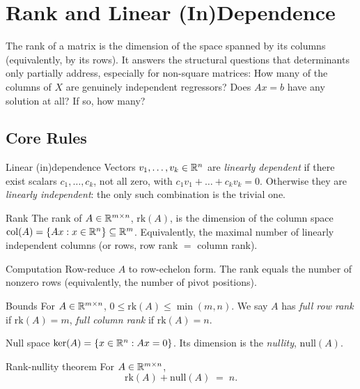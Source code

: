 \chapter{Rank and Linear (In)Dependence}

The rank of a matrix is the dimension of the space spanned by its columns
(equivalently, by its rows). It answers the structural questions that
determinants only partially address, especially for non-square matrices: How
many of the columns of $X$ are genuinely independent regressors? Does
$A x = b$ have any solution at all? If so, how many?

\section{Core Rules}

\begin{rulebox}{Linear (in)dependence}
Vectors $v_{1}, \dots, v_{k} \in \mathbb{R}^{n}$ are \emph{linearly dependent} if
there exist scalars $c_{1}, \dots, c_{k}$, not all zero, with
$c_{1} v_{1} + \dots + c_{k} v_{k} = 0$. Otherwise they are \emph{linearly
independent}: the only such combination is the trivial one.
\end{rulebox}

\begin{rulebox}{Rank}
The rank of $A \in \mathbb{R}^{m \times n}$, $\mathrm{rk}(A)$, is the dimension of
the column space $\mathrm{col}(A) = \{A x : x \in \mathbb{R}^{n}\} \subseteq \mathbb{R}^{m}$.
Equivalently, the maximal number of linearly independent columns (or rows,
row rank $=$ column rank).
\end{rulebox}

\begin{rulebox}{Computation}
Row-reduce $A$ to row-echelon form. The rank equals the number of nonzero
rows (equivalently, the number of pivot positions).
\end{rulebox}

\begin{rulebox}{Bounds}
For $A \in \mathbb{R}^{m \times n}$, $0 \le \mathrm{rk}(A) \le \min(m, n)$. We say
$A$ has \emph{full row rank} if $\mathrm{rk}(A) = m$, \emph{full column
rank} if $\mathrm{rk}(A) = n$.
\end{rulebox}

\begin{rulebox}{Null space}
$\ker(A) = \{x \in \mathbb{R}^{n} : A x = 0\}$. Its dimension is the
\emph{nullity}, $\mathrm{null}(A)$.
\end{rulebox}

\begin{rulebox}{Rank-nullity theorem}
For $A \in \mathbb{R}^{m \times n}$,
\[
\mathrm{rk}(A) + \mathrm{null}(A) \;=\; n.
\]
\end{rulebox}

